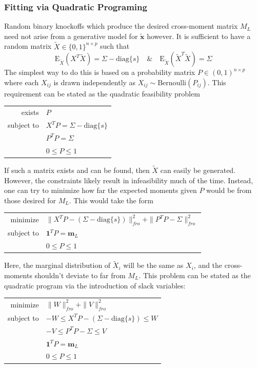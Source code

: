 \documentclass[11pt]{article}
\newcommand{\E}{\mathrm{E}}
\newcommand{\diag}[1]{\mathrm{diag}\{#1\}}
\theoremstyle{definition}
\begin{document}
\subsubsection{Fitting via Quadratic Programing}

        Random binary knockoffs which produce the desired cross-moment matrix $M_L$ need not arise from a generative model for $\mathbf{\tilde x}$ however. It is sufficient to have a random matrix $\tilde X \in \{0,1\}^{n\times p}$ such that 
        \[ \E_{\tilde X}(X^T \tilde X) = \Sigma - \diag{s} \quad \& \quad \E_{\tilde X}(\tilde X^T \tilde X) = \Sigma\]
        The simplest way to do this is based on a probability matrix $P\in (0,1)^{n\times p}$ where each $X_{ij}$ is drawn independently as $X_{ij}\sim\textrm{Bernoulli}(P_{ij})$. This requirement can be stated as the quadratic feasibility problem
            \begin{center}
                \begin{tabular}{r l}
                    exists     & $P$ \\
                    subject to & $X^TP=\Sigma-\diag{s} $ \\
                               & $P^TP=\Sigma $ \\
                               & $0 \leq P \leq 1$
                \end{tabular} 
            \end{center}
        If such a matrix exists and can be found, then $\tilde X$ can easily be generated. However, the constraints likely result in infeasibility much of the time. Instead, one can try to minimize how far the expected moments given $P$ would be from those desired for $M_L$. This would take the form
            \begin{center}
                \begin{tabular}{r l}
                    minimize     & $\|X^TP-(\Sigma-\diag{s})\|_{fro}^2 + \|P^TP-\Sigma\|_{fro}^2 $\\
                    subject to   & $ \mathbf 1^T P = \mathbf m_L $ \\
                                 & $0 \leq P \leq 1$
                \end{tabular} 
            \end{center}
            Here, the marginal distribution of $\tilde X_i$ will be the same as $X_i$, and the cross-moments shouldn't deviate to far from $M_L$. This problem can be stated as the quadratic program via the introduction of slack variables:
            \begin{center}
                \begin{tabular}{r l}
                    minimize     & $\|W\|_{fro}^2 + \|V\|_{fro}^2 $ \\
                    subject to   & $ -W \leq X^TP-(\Sigma-\diag{s})\leq W $ \\
                                 & $ -V \leq P^TP-\Sigma \leq V $ \\
                                 & $ \mathbf 1^T P = \mathbf m_L $ \\
                                 & $0 \leq P \leq 1$
                \end{tabular} 
            \end{center}
\end{document}

